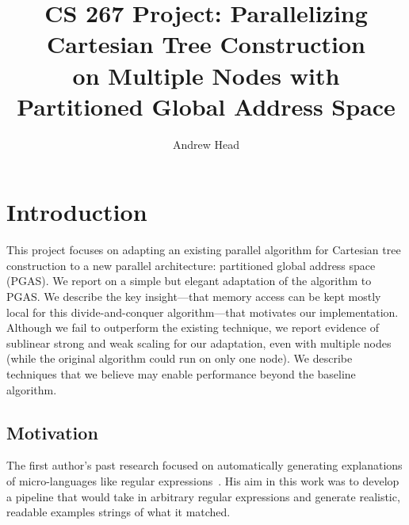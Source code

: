 \documentclass[10pt]{article}
\begin{document}
\title{\Large CS 267 Project: Parallelizing Cartesian Tree Construction \\ 
on Multiple Nodes with Partitioned Global Address Space}
\author{\large Andrew Head}
\date{}
\maketitle



\vspace{-5ex}

\section{Introduction}

This project focuses on adapting an existing parallel algorithm for Cartesian tree construction to
a new parallel architecture: partitioned global address space (PGAS).
We report on a simple but elegant adaptation of the algorithm to PGAS\@.
We describe the key insight---that memory access can be kept mostly local for this
divide-and-conquer algorithm---that motivates our implementation.
Although we fail to outperform the existing technique, we report evidence of sublinear strong and
weak scaling for our adaptation, even with multiple nodes (while the original algorithm could run
on only one node).
We describe techniques that we believe may enable performance beyond the baseline algorithm.

\subsection{Motivation}

The first author's past research focused on automatically generating explanations of
micro-languages like regular expressions~\cite{head_tutorons_2015}.
His aim in this work was to develop a pipeline that would take in arbitrary regular expressions and generate
realistic, readable examples strings of what it matched.
\end{document}
